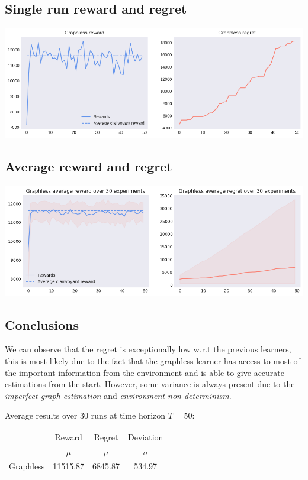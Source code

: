 \subsection{Single run reward and regret}

\begin{center}
	\includegraphics[scale=0.5]{img/Graphs/graphless/image1.png}
\end{center}

\subsection{Average reward and regret}

\begin{center}
	\includegraphics[scale=0.5]{img/Graphs/graphless/image2.png}
\end{center}

\subsection{Conclusions}

We can observe that the regret is exceptionally low w.r.t the previous learners, this is most likely due to the fact that the graphless learner has access to most of the important information from the environment and is able to give accurate estimations from the start.
However, some variance is always present due to the \textit{imperfect graph estimation} and \textit{environment non-determinism}.

Average results over 30 runs at time horizon $T = 50$:

\begin{table}[h]
	\center
	\begin{tabular}{|c|cc|c|}
	\hline \hline
		\cellcolor{blue!25} & Reward 	& Regret	& Deviation \\
	\cline{2-4}
		\cellcolor{blue!25} & $\mu$		& $\mu$		& $\sigma$	\\
	\hline \hline
		Graphless			& 11515.87 	& 6845.87	& 534.97 	\\
	\hline \hline
	\end{tabular}
\end{table}
